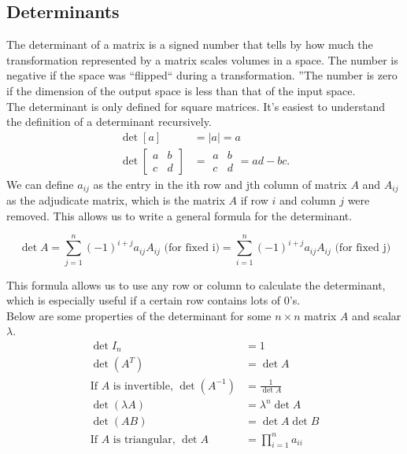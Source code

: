 \subsection{Determinants}
\noindent
The determinant of a matrix is a signed number that tells by how much the transformation represented by a matrix scales volumes in a space.
The number is negative if the space was ``flipped`` during a transformation.
''The number is zero if the dimension of the output space is less than that of the input space.\\

\noindent
The determinant is only defined for square matrices. It's easiest to understand the definition of a determinant recursively.
\begin{align*}
	\det{\left[ a \right]} &= \lvert a \rvert = a \\
	\det{\left[
		\begin{array}{cc}
			a & b \\
			c & d
		\end{array}
		\right]} &= \begin{array}{|cc|}
		a & b \\
		c & d
	\end{array} = ad - bc.
\end{align*}
We can define $a_{ij}$ as the entry in the ith row and jth column of matrix $A$ and $A_{ij}$ as the adjudicate matrix, which is the matrix $A$ if row $i$ and column $j$ were removed. This allows us to write a general formula for the determinant.
\begin{definition}
	\begin{equation*}
		\det{A} = \sum_{j=1}^{n}{\left(-1\right)^{i+j}a_{ij}A_{ij}} \text{ (for fixed i)} = \sum_{i=1}^{n}{\left(-1\right)^{i+j}a_{ij}A_{ij}} \text{ (for fixed j)}
	\end{equation*}
\end{definition}
\noindent
This formula allows us to use any row or column to calculate the determinant, which is especially useful if a certain row contains lots of 0's.\\

\noindent
Below are some properties of the determinant for some $n \times n$ matrix $A$ and scalar $\lambda$.
\begin{align*}
	\det{I_n} &= 1 \\
	\det{(A^T)} &= \det{A} \\
	\text{If $A$ is invertible, } \det{(A^{-1})} &= \frac{1}{\det{A}} \\
	\det{(\lambda A)} &= \lambda^n\det{A} \\
	\det{(AB)} &= \det{A}\det{B} \\
	\text{If $A$ is triangular, } \det{A} &= \prod_{i=1}^{n}{a_{ii}}
\end{align*}

